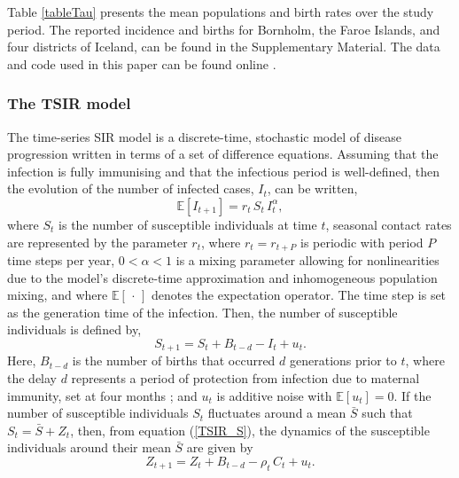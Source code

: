 \documentclass[10pt]{article}
\begin{document}
Table \ref{tableTau} presents the mean populations and birth rates over the study period. The reported incidence and births for Bornholm, the Faroe Islands, and four districts of Iceland, can be found in the Supplementary Material. The data and code used in this paper can be found online \cite{github}.










\subsubsection*{The TSIR model}

The time-series SIR model \cite{Finkenstadt2000} is a discrete-time, stochastic model of disease progression written in terms of a set of difference equations. Assuming that the infection is fully immunising and that the infectious period is well-defined, then the evolution of the number of infected cases, $I_t$, can be written,
\begin{equation}
\mathbb{E}\left[I_{t+1}\right] = r_t \, S_t \, I_t^\alpha,
\label{TSIR_I}
\end{equation}
where $S_t$ is the number of susceptible individuals at time $t$, seasonal contact rates are represented by the parameter $r_t$, where $r_t = r_{t+P}$ is periodic with period $P$ time steps per year, $0 < \alpha < 1$ is a mixing parameter allowing for nonlinearities due to the model's discrete-time approximation and inhomogeneous population mixing, and where $\mathbb{E}\left[\,\cdot\,\right]$ denotes the expectation operator. The time step is set as the generation time of the infection. Then, the number of susceptible individuals is defined by,
\begin{equation}
S_{t+1} = S_t + B_{t-d} - I_t + u_t.
\label{TSIR_S}
\end{equation}
Here, $B_{t-d}$ is the number of births that occurred $d$ generations prior to $t$, where the delay $d$ represents a period of protection from infection due to maternal immunity, set at four months \cite{Anderson1991}; and $u_t$ is additive noise with $\mathbb{E}\left[u_t\right] = 0$. If the number of susceptible individuals $S_t$ fluctuates around a mean $\bar{S}$ such that $S_t = \bar{S} + Z_t$, then, from equation (\ref{TSIR_S}), the dynamics of the susceptible individuals around their mean $\bar{S}$ are given by
\begin{equation}
Z_{t+1} =  Z_{t}+ B_{t-d} - \rho_t\,C_t + u_t.
\label{iter}
\end{equation}
\end{document}
